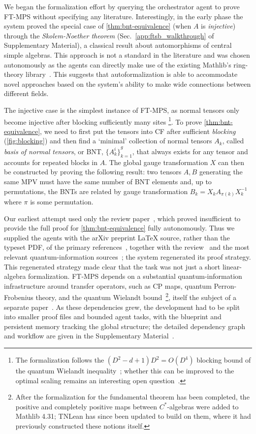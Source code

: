 \documentclass[aps,prl,twocolumn,superscriptaddress,longbibliography,10pt,footinbib]{revtex4-2}
\begin{document}
We began the formalization effort by querying the orchestrator agent to prove FT-MPS without specifying any literature. Interestingly, in the early phase the system proved the special case of \cref{thm:bnt-equivalence} (when $A$ is \textit{injective}) through the \emph{Skolem-Noether theorem} (Sec.~\ref{app:ftsb_walkthrough} of Supplementary Material), a classical result about automorphisms of central simple algebras. This approach is not a standard in the literature and was chosen autonomously as the agents can directly make use of the existing Mathlib's ring-theory library~\cite{Supp}. This suggests that autoformalization is able to accommodate novel approaches based on the system's ability to make wide connections between different fields.

The injective case is the simplest instance of FT-MPS, as normal tensors only become injective after blocking sufficiently many sites%
\footnote{The formalization follows the $(D^2-d+1)D^2 = O(D^4)$ blocking bound of the quantum Wielandt inequality~\cite{Sanz2010Quantum}; whether this can be improved to the optimal scaling remains an interesting open question~\cite{Michalek2019Quantum,Shitov2023Growth}.}.
To prove \cref{thm:bnt-equivalence}, we need to first put the tensors into CF after sufficient \emph{blocking} (\cref{fig:blocking}) and then find a `minimal' collection of normal tensors $A_k$, called \textit{basis of normal tensors}, or BNT, ${\{A_k^i\}}_{k=1}^g$, that always exists for any tensor and accounts for repeated blocks in $A$. The global gauge transformation $X$ can then be constructed by proving the following result: two tensors $A,B$ generating the same MPV must have the same number of BNT elements and, up to permutations, the BNTs are related by gauge transformation $B_k=X_k A_{\pi(k)}X_k^{-1}$ where $\pi$ is some permutation.

Our earliest attempt used only the review paper~\cite{Cirac2021Matrix}, which proved insufficient to provide the full proof for \cref{thm:bnt-equivalence} fully autonomously. Thus we supplied the agents with the arXiv preprint \LaTeX{} source, rather than the typeset PDF, of the primary references~\cite{Perez-Garcia2007Matrix,Cirac2017Matrixa}, together with the review~\cite{Cirac2021Matrix} and the most relevant quantum-information sources~\cite{Wolf2012Quantum,Sanz2010Quantum}; the system regenerated its proof strategy.
This regenerated strategy made clear that the task was not just a short linear-algebra formalization. FT-MPS depends on a substantial quantum-information infrastructure around transfer operators, such as CP maps, quantum Perron-Frobenius theory, and the quantum Wielandt bound~\footnote{After the formalization for the fundamental theorem has been completed, the positive and completely positive maps between $C^*$-algebras were added to Mathlib 4.31; TNLean has since been updated to build on them, where it had previously constructed these notions itself.}, itself the subject of a separate paper~\cite{Sanz2010Quantum}.
As these dependencies grew, the development had to be split into smaller proof files and bounded agent tasks, with the blueprint and persistent memory tracking the global structure; the detailed dependency graph and workflow are given in the Supplementary Material~\cite{Supp}.
\end{document}
